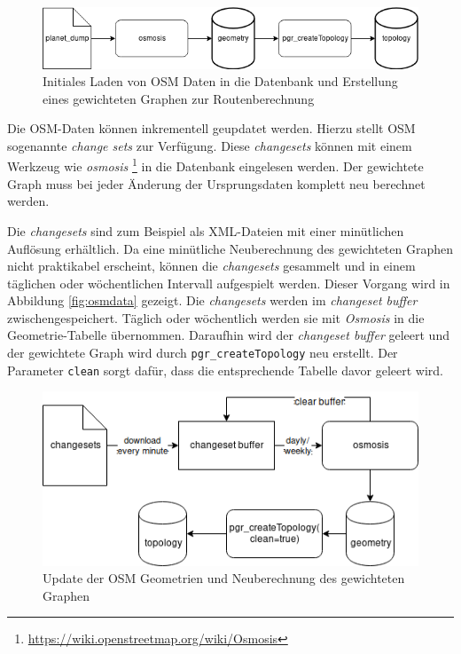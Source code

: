 \documentclass[
ngerman          %
,a4paper          %
,11pt
,pdftex
]{report}
\begin{document}
\begin{figure}[htbp]
\centering
\includegraphics[width=.9\linewidth]{osm-data-initial.png}
\caption{\label{fig:orgfade148}
Initiales Laden von OSM Daten in die Datenbank und Erstellung eines gewichteten Graphen zur Routenberechnung}
\end{figure}

Die \ac{OSM}-Daten können inkrementell geupdatet werden. Hierzu stellt \ac{OSM} sogenannte \emph{change sets} zur Verfügung. Diese \emph{changesets} können mit einem Werkzeug wie \emph{osmosis} \footnote{\url{https://wiki.openstreetmap.org/wiki/Osmosis}} in die Datenbank eingelesen werden. Der gewichtete Graph muss bei jeder Änderung der Ursprungsdaten komplett neu berechnet werden.

Die \emph{changesets} sind zum Beispiel als \ac{XML}-Dateien mit einer minütlichen Auflösung erhältlich. Da eine minütliche Neuberechnung des gewichteten Graphen nicht praktikabel erscheint, können die \emph{changesets} gesammelt und in einem täglichen oder wöchentlichen Intervall aufgespielt werden. Dieser Vorgang wird in Abbildung \ref{fig:osmdata} gezeigt. Die \emph{changesets} werden im \emph{changeset buffer} zwischengespeichert. Täglich oder wöchentlich werden sie mit \emph{Osmosis} in die Geometrie-Tabelle übernommen. Daraufhin wird der \emph{changeset buffer} geleert und der gewichtete Graph wird durch \texttt{pgr\_createTopology} neu erstellt. Der Parameter \texttt{clean} sorgt dafür, dass die entsprechende Tabelle davor geleert wird.

\begin{figure}[htbp]
\centering
\includegraphics[width=.9\linewidth]{osm-data-update.png}
\caption{\label{fig:orgbb24e88}
Update der OSM Geometrien und Neuberechnung des gewichteten Graphen}
\end{figure}
\end{document}
